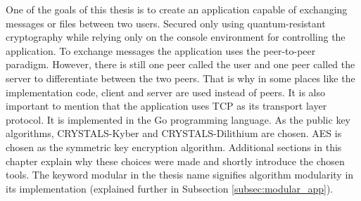 One of the goals of this thesis is to create an application capable of exchanging messages or files between two users. Secured only using quantum-resistant cryptography while relying only on the console environment for controlling the application. To exchange messages the application uses the peer-to-peer paradigm. However, there is still one peer called the user and one peer called the server to differentiate between the two peers. That is why in some places like the implementation code, client and server are used instead of peers. It is also important to mention that the application uses TCP as its transport layer protocol. It is implemented in the Go programming language. As the public key algorithms, CRYSTALS-Kyber and CRYSTALS-Dilithium are chosen. AES is chosen as the symmetric key encryption algorithm. Additional sections in this chapter explain why these choices were made and shortly introduce the chosen tools. The keyword modular in the thesis name signifies algorithm modularity in its implementation (explained further in Subsection \ref{subsec:modular_app}).
